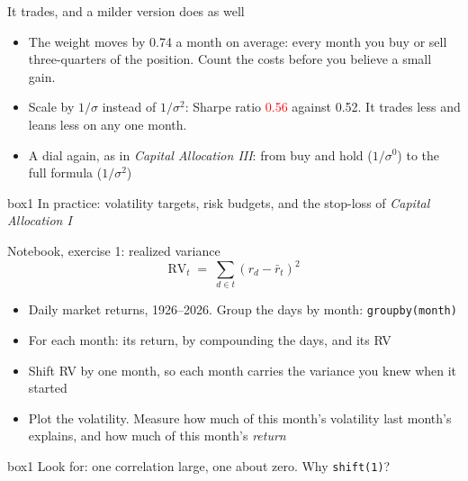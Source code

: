 \documentclass[aspectratio=169,10pt]{beamer}
\begin{document}
\begin{frame}{It trades, and a milder version does as well}
\vskip 6pt
\begin{itemize}
\item The weight moves by 0.74 a month on average: every month you buy or sell three-quarters of the position. Count the costs before you believe a small gain.
\vskip 10pt
\item Scale by $1/\sigma$ instead of $1/\sigma^{2}$: Sharpe ratio \textcolor{red}{0.56} against 0.52. It trades less and leans less on any one month.
\vskip 10pt
\item A dial again, as in \emph{Capital Allocation III}: from buy and hold ($1/\sigma^{0}$) to the full formula ($1/\sigma^{2}$)
\end{itemize}
\vskip 14pt
\begin{beamercolorbox}[rounded=true,sep=7pt,center]{box1}
In practice: volatility targets, risk budgets, and the stop-loss of \emph{Capital Allocation I}
\end{beamercolorbox}
\end{frame}

\begin{frame}{Notebook, exercise 1: realized variance}
\vskip 4pt
\[ \text{RV}_{t} \;=\; \sum_{d \in t} \left(r_{d} - \bar r_{t}\right)^{2} \]
\vskip 4pt
\begin{itemize}
\item Daily market returns, 1926--2026. Group the days by month: \texttt{groupby(month)}
\vskip 6pt
\item For each month: its return, by compounding the days, and its RV
\vskip 6pt
\item Shift RV by one month, so each month carries the variance you knew when it started
\vskip 6pt
\item Plot the volatility. Measure how much of this month's volatility last month's explains, and how much of this month's \emph{return}
\end{itemize}
\vskip 10pt
\begin{beamercolorbox}[rounded=true,sep=7pt,center]{box1}
Look for: one correlation large, one about zero. Why \texttt{shift(1)}?
\end{beamercolorbox}
\end{frame}
\end{document}
